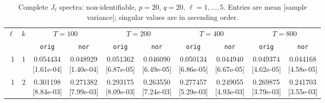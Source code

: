 \documentclass[12pt,letterpaper]{article}
\def\spacingset#1{\renewcommand{\baselinestretch}{#1}\small\normalsize}
\theoremstyle{plain}
\theoremstyle{definition}
\begin{document}
\clearpage
\begin{table}[p]
\begingroup
\spacingset{1.0}
\small\centering
\caption{Complete $J_\ell$ spectra: non-identifiable, $p=20$, $q=20$, $\ell=1,\ldots,5$. Entries are mean [sample variance]; singular values are in ascending order.}
\label{s23:lambda:alltab:spectra:p20q20exterior:1-5}
\footnotesize
\setlength{\tabcolsep}{2.2pt}
\renewcommand{\arraystretch}{1.03}
\begin{adjustbox}{max width=\linewidth}
\begin{tabular}{@{}rr*{8}{c}@{}}
\toprule
$\ell$ & $k$ & \multicolumn{2}{c}{$T=100$} & \multicolumn{2}{c}{$T=200$} & \multicolumn{2}{c}{$T=400$} & \multicolumn{2}{c}{$T=800$}\\
\cmidrule(lr){3-4}\cmidrule(lr){5-6}\cmidrule(lr){7-8}\cmidrule(lr){9-10}
 &  & \texttt{orig} & \texttt{nor} & \texttt{orig} & \texttt{nor} & \texttt{orig} & \texttt{nor} & \texttt{orig} & \texttt{nor}\\
\midrule
1 & 1 & \shortstack{0.054434\\[-1pt]{\scriptsize[1.61e-04]}} & \shortstack{0.048929\\[-1pt]{\scriptsize[1.40e-04]}} & \shortstack{0.051362\\[-1pt]{\scriptsize[6.87e-05]}} & \shortstack{0.046090\\[-1pt]{\scriptsize[6.49e-05]}} & \shortstack{0.050134\\[-1pt]{\scriptsize[6.86e-05]}} & \shortstack{0.044940\\[-1pt]{\scriptsize[6.67e-05]}} & \shortstack{0.049374\\[-1pt]{\scriptsize[4.62e-05]}} & \shortstack{0.044168\\[-1pt]{\scriptsize[4.58e-05]}}\\
1 & 2 & \shortstack{0.301198\\[-1pt]{\scriptsize[8.84e-03]}} & \shortstack{0.271382\\[-1pt]{\scriptsize[7.99e-03]}} & \shortstack{0.293175\\[-1pt]{\scriptsize[8.09e-03]}} & \shortstack{0.263550\\[-1pt]{\scriptsize[7.24e-03]}} & \shortstack{0.277457\\[-1pt]{\scriptsize[5.29e-03]}} & \shortstack{0.249055\\[-1pt]{\scriptsize[4.93e-03]}} & \shortstack{0.269875\\[-1pt]{\scriptsize[3.79e-03]}} & \shortstack{0.241703\\[-1pt]{\scriptsize[3.55e-03]}}\\

\end{tabular}
\end{adjustbox}
\end{table}
\end{document}
